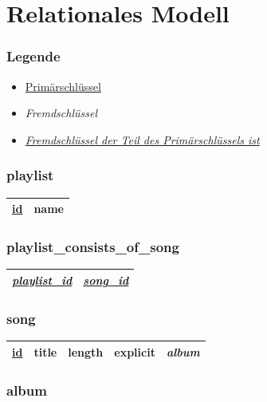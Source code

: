 \documentclass{article}
\begin{document}
\newpage

\section{Relationales Modell}

\subsubsection*{Legende}

\begin{itemize}
	\item[] \underline{Primärschlüssel}
	\item[] \textit{Fremdschlüssel}
	\item[] \underline{\textit{Fremdschlüssel der Teil des Primärschlüssels ist}}
\end{itemize}

\subsubsection*{playlist}

\begin{tabularx}{4cm}{|X|X|}
	\hline
	\underline{id} & name \\
	\hline
\end{tabularx}

\subsubsection*{playlist\_consists\_of\_song}

\begin{tabularx}{6cm}{|X|X|}
	\hline
	\underline{\textit{playlist\_id}} & \underline{\textit{song\_id}} \\
	\hline
\end{tabularx}

\subsubsection*{song}

\begin{tabularx}{10cm}{|X|X|X|X|X|}
	\hline
	\underline{id} & title & length & explicit & \textit{album} \\
	\hline
\end{tabularx}

\subsubsection*{album}
\end{document}
